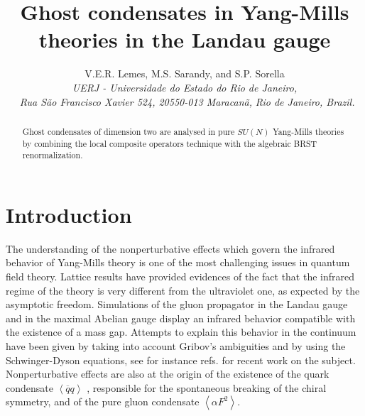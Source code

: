 \documentclass[a4paper,12pt]{article}
\begin{document}
\title{\textbf{Ghost condensates in Yang-Mills theories in the Landau gauge }}
\author{V.E.R. Lemes, M.S. Sarandy, and S.P. Sorella \\
{\small {\textit{UERJ - Universidade do Estado do Rio de Janeiro,}}} \\
{\small {\textit{\ Rua S\~{a}o Francisco Xavier 524, 20550-013 Maracan\~{a}, 
}}} {\small {\textit{Rio de Janeiro, Brazil.}}}}
\maketitle

\begin{abstract}
Ghost condensates of dimension two are analysed in pure $SU(N)$ Yang-Mills
theories by combining the local composite operators technique with the
algebraic BRST renormalization.
\end{abstract}

\vfill\newpage

\section{Introduction}

The understanding of the nonperturbative effects which govern the infrared
behavior of Yang-Mills theory is one of the most challenging issues in
quantum field theory. Lattice results have provided evidences of the fact
that the infrared regime of the theory is very different from the
ultraviolet one, as expected by the asymptotic freedom. Simulations of the
gluon propagator in the Landau gauge \cite{lg} and in the maximal Abelian
gauge \cite{as} display an infrared behavior compatible with the existence
of a mass gap. Attempts to explain this behavior in the continuum have been
given by taking into account Gribov's ambiguities and by using the
Schwinger-Dyson equations, see for instance refs.\cite{zw,sd} for recent
work on the subject. Nonperturbative effects are also at the origin of the
existence of the quark condensate $\left\langle \overline{q}q\right\rangle $%
, responsible for the spontaneous breaking of the chiral symmetry, and of
the pure gluon condensate $\left\langle \alpha F^{2}\right\rangle $.
\end{document}
